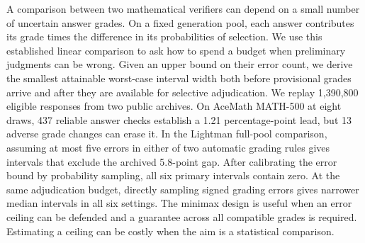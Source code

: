 A comparison between two mathematical verifiers can depend on a small number of uncertain answer grades. On a fixed generation pool, each answer contributes its grade times the difference in its probabilities of selection. We use this established linear comparison to ask how to spend a budget when preliminary judgments can be wrong. Given an upper bound on their error count, we derive the smallest attainable worst-case interval width both before provisional grades arrive and after they are available for selective adjudication. We replay 1,390,800 eligible responses from two public archives. On AceMath MATH-500 at eight draws, 437 reliable answer checks establish a 1.21 percentage-point lead, but 13 adverse grade changes can erase it. In the Lightman full-pool comparison, assuming at most five errors in either of two automatic grading rules gives intervals that exclude the archived 5.8-point gap. After calibrating the error bound by probability sampling, all six primary intervals contain zero. At the same adjudication budget, directly sampling signed grading errors gives narrower median intervals in all six settings. The minimax design is useful when an error ceiling can be defended and a guarantee across all compatible grades is required. Estimating a ceiling can be costly when the aim is a statistical comparison.
